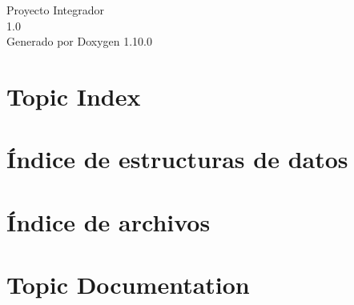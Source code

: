\documentclass[twoside]{book}
\newcommand{\+}{\discretionary{\mbox{\scriptsize$\hookleftarrow$}}{}{}}
\newcommand{\clearemptydoublepage}{%
    \newpage{\pagestyle{empty}\cleardoublepage}%
  }
\begin{document}
  \raggedbottom
    \hypersetup{pageanchor=false,
                bookmarksnumbered=true,
                pdfencoding=unicode
               }
  \begin{titlepage}
  \vspace*{7cm}
  \begin{center}%
  {\Large Proyecto Integrador}\\
  [1ex]\large 1.\+0 \\
  \vspace*{1cm}
  {\large Generado por Doxygen 1.10.0}\\
  \end{center}
  \end{titlepage}
  \clearemptydoublepage
  \tableofcontents
  \clearemptydoublepage
  \hypersetup{pageanchor=true}


\chapter{Topic Index}

\chapter{Índice de estructuras de datos}

\chapter{Índice de archivos}

\chapter{Topic Documentation}

\end{document}
